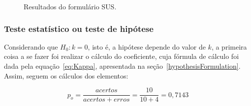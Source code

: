 \begin{figure}[!htb]
\begin{center}
{    }\hspace{10mm}
    \caption{Resultados do formulário SUS.}
    \label{fig:SusResultados}
  \end{center}
\end{figure}

\subsubsection{Teste estatístico ou teste de hipótese}
\label{hypothesisTest}

Considerando que $H_0: k = 0$,  isto é, a hipótese depende do valor de
$k$,  a  primeira  coisa  a   se  fazer  foi  realizar  o  cálculo  do
coeficiente,    cuja    fórmula    de    cálculo   foi    dada    pela
equação~\ref{eq:Kappa},                 apresentada                 na
seção~\ref{hypothesisFormulation}.   Assim,  seguem  os  cálculos  dos
elementos:

\begin{displaymath}
  p_{o} = 
  \frac{acertos}{acertos + erros} =
  \frac{10}{10 + 4} = 0,7143
\end{displaymath}


